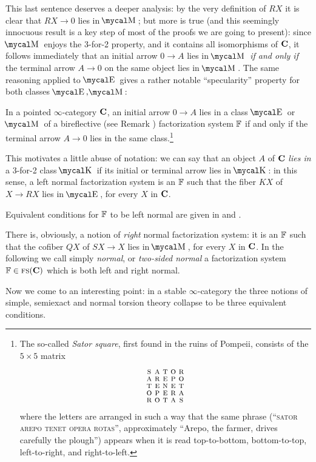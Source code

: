 \begin{remark}
This last sentence deserves a deeper analysis: by the very definition of $RX$ it is clear that $RX\to 0$ lies in $\MM$; but more is true (and this seemingly innocuous result is a key step of most of the proofs we are going to present): since $\MM$ enjoys the 3\hyp{}for\hyp{}2 property, and it contains all isomorphisms of $\textbf{C}$, it follows immediately that an initial arrow $0\to A$ lies in $\MM$ \emph{if and only if} the terminal arrow $A\to 0$ on the same object lies in $\MM$. The same reasoning applied to $\EE$ gives a rather notable ``specularity'' property for both classes $\EE,\MM$:
\begin{lemma}\label{satorlemma}
In a pointed $\infty$\hyp{}category $\textbf{C}$, an initial arrow $0\to A$ lies in a class $\EE$ or $\MM$ of a bireflective (see Remark ) factorization system $\mathbb{F}$ if and only if the terminal arrow $A\to 0$ lies in the same class.\footnote{The so\hyp{}called \emph{Sator square}, first found in the ruins of Pompeii, consists of the $5\times 5$ matrix 
\[
\xymatrix@R=-1mm@C=-1mm{ 
\sator\\
\arepo\\
\tenet\\
\opera\\
\rotas
}
\]
where the letters are arranged in such a way that the same phrase (``\textsc{sator arepo tenet opera rotas}'', approximately ``Arepo, the farmer, drives carefully the plough'') appears when it is read top\hyp{}to\hyp{}bottom, bottom\hyp{}to\hyp{}top, left\hyp{}to\hyp{}right, and right\hyp{}to\hyp{}left.}
\end{lemma}
\begin{notat}\label{liesin} This motivates a little abuse of notation: we can say that an object $A$ of $\textbf{C}$ \emph{lies in} a 3\hyp{}for\hyp{}2 class $\K$ if its initial or terminal arrow lies in $\K$: in this sense, a left normal factorization system is an $\mathbb{F}$ such that the fiber $KX$ of $X\to RX$ lies in $\EE$, for every $X$ in $\textbf{C}$.
\end{notat}
\end{remark}
Equivalent conditions for $\mathbb{F}$ to be left normal are given in \cite[Thm. \textbf{4.10}]{RT} and \cite[\textbf{7.3}]{CHK}.
\begin{remark}
There is, obviously, a notion of \emph{right} normal factorization system: it is an $\mathbb{F}$ such that the cofiber $QX$ of $SX\to X$ lies in $\MM$, for every $X$ in $\textbf{C}$. In the following we call simply \emph{normal}, or \emph{two\hyp{}sided normal} a factorization system $\mathbb{F}\in \text{\scshape fs}(\textbf{C})$ which is both left and right normal.
\end{remark}
Now we come to an interesting point:
in a stable $\infty$\hyp{}category the three notions of simple, semiexact and normal torsion theory collapse to be three equivalent conditions.

